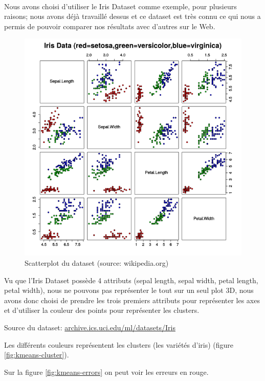 \documentclass{article}
\begin{document}
  \

  Nous avons choisi d'utiliser le Iris Dataset comme exemple, pour plusieurs raisons;
  nous avons déjà travaillé dessus et ce dataset est très connu ce qui nous a permis de
  pouvoir comparer nos résultats avec d'autres sur le Web.

  \begin{figure}[h]
    \centering
    \includegraphics[scale=0.5]{images/Iris_dataset_scatterplot.png}
    \caption{Scatterplot du dataset (source: wikipedia.org)}
    \label{fig:scatterplot-wiki}
  \end{figure}



  Vu que l'Iris Dataset possède 4 attributs (sepal length, sepal width, petal length, petal width),
  nous ne pouvons pas représenter le tout sur un seul plot 3D, nous avons donc choisi de prendre les trois premiers attributs
  pour représenter les axes
  et d'utiliser la couleur des points pour représenter les clusters.

  Source du dataset: \url{archive.ics.uci.edu/ml/datasets/Iris}

  Les différents couleurs représentent les clusters (les variétés d'iris) (figure \ref{fig:kmeans-cluster}).

  Sur la figure \ref{fig:kmeans-errors} on peut voir les erreurs en rouge.
\end{document}

